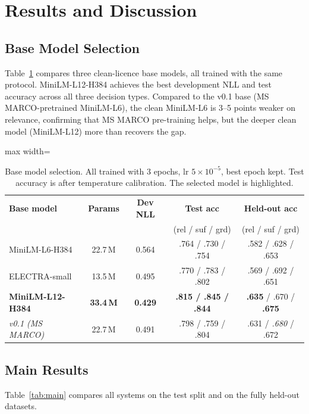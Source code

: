 \documentclass[twocolumn]{ICCKjournal}
\begin{document}
\section{Results and Discussion}
\label{sec:results}

\subsection{Base Model Selection}
\label{sec:baseselection}
Table~\ref{tab:baseselection} compares three clean-licence base models, all trained with the same protocol. MiniLM-L12-H384 achieves the best development NLL and test accuracy across all three decision types. Compared to the v0.1 base (MS MARCO-pretrained MiniLM-L6), the clean MiniLM-L6 is 3--5 points weaker on relevance, confirming that MS MARCO pre-training helps, but the deeper clean model (MiniLM-L12) more than recovers the gap.

\begin{table}[H]
\caption{Base model selection. All trained with 3 epochs, lr $5\!\times\!10^{-5}$, best epoch kept. Test accuracy is after temperature calibration. The selected model is highlighted.}
\label{tab:baseselection}
\centering
\small
\begin{adjustbox}{max width=\linewidth}
\begin{tabular}{lcccc}
\toprule
\textbf{Base model} & \textbf{Params} & \textbf{Dev NLL} & \textbf{Test acc} & \textbf{Held-out acc} \\
 & & & (rel / suf / grd) & (rel / suf / grd) \\
\midrule
MiniLM-L6-H384 & 22.7\,M & 0.564 & .764 / .730 / .754 & .582 / .628 / .653 \\
ELECTRA-small & 13.5\,M & 0.495 & .770 / .783 / .802 & .569 / .692 / .651 \\
\textbf{MiniLM-L12-H384} & \textbf{33.4\,M} & \textbf{0.429} & \textbf{.815 / .845 / .844} & \textbf{.635} / .670 / \textbf{.675} \\
\midrule
\textit{v0.1 (MS MARCO)} & 22.7\,M & 0.491 & .798 / .759 / .804 & .631 / \textit{.680} / .672 \\
\bottomrule
\end{tabular}
\end{adjustbox}
\end{table}

\subsection{Main Results}
\label{sec:mainresults}
Table~\ref{tab:main} compares all systems on the test split and on the fully held-out datasets.
\end{document}
